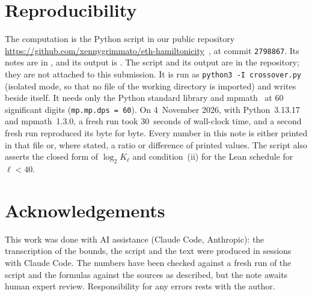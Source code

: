\documentclass[10pt]{amsart}
\theoremstyle{definition}
\theoremstyle{remark}
\numberwithin{equation}{section}
\begin{document}
\section{Reproducibility}\label{sec:repro}
The computation is the Python script  in our public repository
\url{https://github.com/xennygrimmato/eth-hamiltonicity}~\cite{TulsyanRepo26}, at commit
\texttt{2798867}. Its notes are in , and its output is
. The script and its output are in the repository; they are not
attached to this submission. It is run as \texttt{python3 -I crossover.py} (isolated mode, so that no
file of the working directory is imported) and writes  beside itself. It needs only
the Python standard library and mpmath~\cite{mpmath} at $60$ significant digits
(\texttt{mp.mp.dps = 60}). On 4~November 2026, with Python~3.13.17 and mpmath~1.3.0, a fresh run
took $30$~seconds of wall-clock time, and a second fresh run reproduced its  byte
for byte. Every number in this note is either printed in that file
or, where stated, a ratio or difference of printed values. The script also asserts the closed form
of $\log_2K_\ell$ and condition~(ii) for the Lean schedule for $\ell<40$.

\section*{Acknowledgements}
This work was done with AI assistance (Claude Code, Anthropic): the transcription of the bounds,
the script and the text were produced in sessions with Claude Code. The numbers have been checked
against a fresh run of the script and the formulas against the sources as described, but the note
awaits human expert review. Responsibility for any errors rests with the author.
\end{document}
